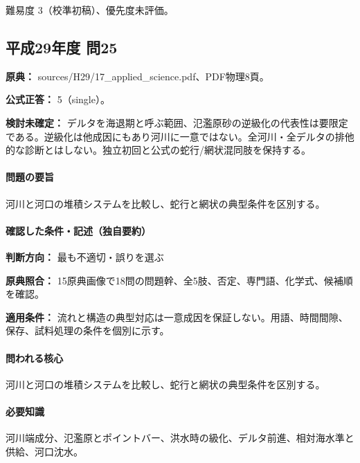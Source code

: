 \par 難易度 3（校準初稿）、優先度未評価。

\subsection{平成29年度 問25}
\label{q:h29-reg-applied-25}

\noindent\textbf{原典：} sources/H29/17\_applied\_science.pdf、PDF物理8頁。

\textbf{公式正答：} 5（single）。

\par\textbf{検討未確定：} デルタを海退期と呼ぶ範囲、氾濫原砂の逆級化の代表性は要限定である。逆級化は他成因にもあり河川に一意ではない。全河川・全デルタの排他的な診断とはしない。独立初回と公式の蛇行/網状混同肢を保持する。

\paragraph{問題の要旨} 河川と河口の堆積システムを比較し、蛇行と網状の典型条件を区別する。

\paragraph{確認した条件・記述（独自要約）}\mbox{}\par

\noindent\textbf{判断方向：} 最も不適切・誤りを選ぶ\par

\noindent\textbf{原典照合：} 15原典画像で18問の問題幹、全5肢、否定、専門語、化学式、候補順を確認。\par

\noindent\textbf{適用条件：} 流れと構造の典型対応は一意成因を保証しない。用語、時間間隙、保存、試料処理の条件を個別に示す。\par

\paragraph{問われる核心} 河川と河口の堆積システムを比較し、蛇行と網状の典型条件を区別する。

\paragraph{必要知識} 河川端成分、氾濫原とポイントバー、洪水時の級化、デルタ前進、相対海水準と供給、河口沈水。

